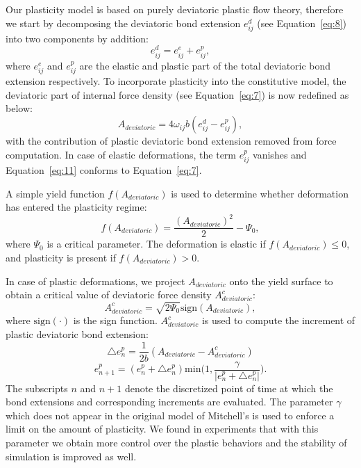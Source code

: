 Our plasticity model is based on purely deviatoric plastic flow theory, therefore we start by decomposing the deviatoric bond extension $e_{ij}^d$ (see Equation~\ref{eq:8}) into two components by addition:
\begin{equation}
e_{ij}^d = e_{ij}^e+e_{ij}^p,
\label{eq:10}
\end{equation}
where $e_{ij}^e$ and $e_{ij}^p$ are the elastic and plastic part of the total deviatoric bond extension respectively. To incorporate plasticity into the constitutive model,  the deviatoric part of internal force density (see Equation~\ref{eq:7}) is now redefined as below:
\begin{equation}
A_{deviatoric} = 4\omega_{ij}b(e_{ij}^d-e_{ij}^p),
\label{eq:11}
\end{equation}
with the contribution of plastic deviatoric bond extension removed from force computation. In case of elastic deformations, the term $e_{ij}^p$ vanishes and Equation~\ref{eq:11} conforms to Equation~\ref{eq:7}.

A simple yield function $f(A_{deviatoric})$ is used to determine whether deformation has entered the plasticity regime:
\begin{equation}
f(A_{deviatoric}) = \frac{(A_{deviatoric})^2}{2}-\Psi_0,
\label{eq:12}
\end{equation}
where $\Psi_0$ is a critical parameter. The deformation is elastic if $f(A_{deviatoric})\leq 0$, and plasticity is present if  $f(A_{deviatoric}) > 0$.

In case of plastic deformations, we project $A_{deviatoric}$ onto the yield surface to obtain a critical value of deviatoric force density $A_{deviatoric}^c$:
\begin{equation}
A_{deviatoric}^c=\sqrt{2\Psi_0}\mathrm{sign}(A_{deviatoric}),
\label{eq:13}
\end{equation}
where $\mathrm{sign}(\cdot)$ is the sign function. $A_{deviatoric}^c$ is used to compute the increment of plastic deviatoric bond extension:
\begin{equation}
\triangle e_n^p = \frac{1}{2b}(A_{deviatoric}-A_{deviatoric}^c)
\label{eq:14}
\end{equation}
\begin{equation}
e_{n+1}^p = (e_n^p+\triangle e_n^p)\mathrm{min}\big(1,\frac{\gamma}{|e_n^p+\triangle e_n^p|}\big).
\label{eq:15}
\end{equation}
The subscripts $n$ and $n+1$ denote the discretized point of time at which the bond extensions and corresponding increments are evaluated. The parameter $\gamma$ which does not appear in the original model of Mitchell's \cite{mitchell2011nonlocal} is used to enforce a limit on the amount of plasticity. We found in experiments that with this parameter we obtain more control over the plastic behaviors and the stability of simulation is improved as well.

